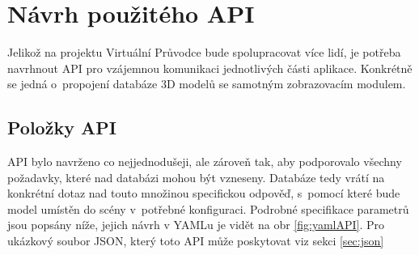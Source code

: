 \documentclass[thesis=B,czech]{FITthesis}[2012/06/26]
\begin{document}
	\section{Návrh použitého API}
	\label{sec:API}
    
    Jelikož na projektu Virtuální Průvodce bude spolupracovat více lidí, je potřeba navrhnout API pro vzájemnou komunikaci jednotlivých části aplikace. Konkrétně se jedná o~propojení databáze 3D modelů se samotným zobrazovacím modulem.

    
      \subsection{Položky API}
      
      API bylo navrženo co nejjednodušeji, ale zároveň tak, aby  podporovalo všechny požadavky, které nad databázi mohou být vzneseny. Databáze tedy vrátí na konkrétní dotaz nad touto množinou specifickou odpověď, s~pomocí které bude model umístěn do scény v~potřebné konfiguraci. Podrobné specifikace parametrů jsou popsány níže, jejich návrh v YAMLu je vidět na obr \ref{fig:yamlAPI}. Pro ukázkový soubor JSON, který toto API může poskytovat viz sekci \ref{sec:json}
	
\end{document}
